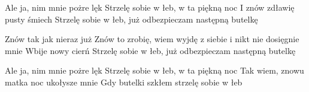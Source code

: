 \documentclass[../../../songbook.tex]{subfiles}
\begin{document}
\-\hspace{1cm} Ale ja, nim mnie pożre lęk							 \newline
\-\hspace{1cm} Strzelę sobie w łeb, w ta piękną noc							 \newline
\-\hspace{1cm} I znów zdławię pusty śmiech 							 \newline
\-\hspace{1cm} Strzelę sobie w łeb, już odbezpieczam następną butelkę							 \newline
	
\-\hspace{1cm} Znów tak jak nieraz już							 \newline
\-\hspace{1cm} Znów to zrobię, wiem wyjdę z siebie i nikt nie dosięgnie mnie							 \newline
\-\hspace{1cm} Wbije nowy cierń							 \newline
\-\hspace{1cm} Strzelę sobie w łeb, już odbezpieczam następną butelkę							 \newline

\-\hspace{1cm} Ale ja, nim mnie pożre lęk							 \newline
\-\hspace{1cm} Strzelę sobie w łeb, w ta piękną noc							 \newline
\-\hspace{1cm} Tak wiem, znowu matka noc ukołysze mnie							 \newline
\-\hspace{1cm} Gdy butelki szkłem strzelę sobie w łeb							 \newline
\end{document}
